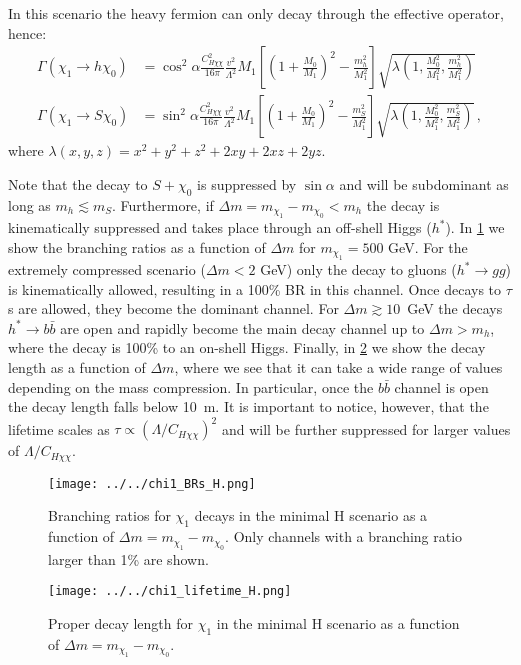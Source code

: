 \documentclass[a4paper,11pt]{article}
\begin{document}
In this scenario the heavy fermion can only decay through the effective operator, hence:
\begin{align}
	\Gamma (\chi_1 \to h \chi_0) & = \cos^2\alpha \frac{C_{H\chi\chi}^2}{16 \pi} \frac{v^2}{\Lambda^2} M_1 \left[\left(1 + \frac{M_0}{M_1}\right)^2 - \frac{m_h^2}{M_1^2} \right]  \sqrt{\lambda\left(1,\frac{M_0^2}{M_1^2},\frac{m_h^2}{M_1^2}\right)}\\
	\Gamma (\chi_1 \to S \chi_0) & = \sin^2\alpha \frac{C_{H\chi\chi}^2}{16 \pi} \frac{v^2}{\Lambda^2} M_1 \left[\left(1 + \frac{M_0}{M_1}\right)^2 - \frac{m_S^2}{M_1^2} \right]  \sqrt{\lambda\left(1,\frac{M_0^2}{M_1^2},\frac{m_S^2}{M_1^2}\right)}\, ,
\end{align} 
where $\lambda(x,y,z) = x^2 + y^2 + z^2 + 2 x y + 2 x z + 2 y z$.


Note that the decay to $S + \chi_0$ is suppressed by $\sin\alpha$ and will be subdominant as long as $m_h \lesssim m_S$.
Furthermore, if $\Delta m = m_{\chi_1} - m_{\chi_0}  < m_h$ the decay is kinematically suppressed and takes place through an off-shell Higgs ($h^*$). In \cref{fig:chi1_decayH} we show the branching ratios as a function of $\Delta m$ for $m_{\chi_1} = 500$ GeV.
For the extremely compressed scenario ($\Delta m < 2$ GeV) only the decay to gluons ($h^* \to g g$) is kinematically allowed, resulting in a 100\% BR in this channel. Once decays to $\tau$s are allowed, they become the dominant channel. For $\Delta m \gtrsim 10$~GeV the decays $h^* \to b \bar{b}$ are open and rapidly become the main decay channel up to $\Delta m > m_h$, where the decay is 100\% to an on-shell Higgs.
Finally, in \cref{fig:chi1_lifetimeH} we show the decay length as a function of $\Delta m$, where we see that it can take a wide range of values depending on the mass compression. In particular, once the $b \bar{b}$ channel is open the decay length falls below 10~m. It is important to notice, however, that the lifetime scales as  $\tau \propto \left(\Lambda/C_{H\chi\chi}\right)^2$ and will be further suppressed for larger values of $\Lambda/C_{H\chi\chi}$.

\begin{figure}
	\centering
	\texttt{[image: ../../chi1\_BRs\_H.png]}
	\caption{Branching ratios for $\chi_1$ decays in the minimal H scenario as a function of $\Delta m = m_{\chi_1} - m_{\chi_0}$. Only channels with a branching ratio larger than 1\% are shown.} \label{fig:chi1_decayH}
\end{figure}

\begin{figure}
	\centering
	\texttt{[image: ../../chi1\_lifetime\_H.png]}
	\caption{Proper decay length for $\chi_1$ in the minimal H scenario as a function of $\Delta m = m_{\chi_1} - m_{\chi_0}$.} \label{fig:chi1_lifetimeH}
\end{figure}
\end{document}
